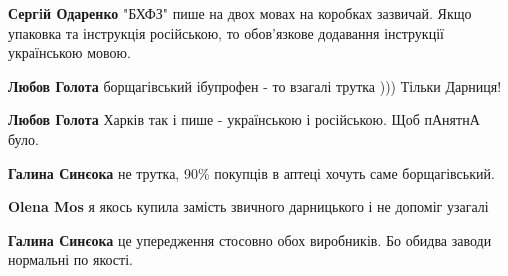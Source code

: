 \begin{itemize}
\begin{itemize}
\textbf{Сергiй Одаренко} "БХФЗ" пише на двох мовах на коробках зазвичай. Якщо
упаковка та інструкція російською, то обов'язкове додавання інструкції
українською мовою.

 
\textbf{Любов Голота} борщагівський ібупрофен - то взагалі трутка ))) Тільки Дарниця! \Smiley[1.0][yellow]

 
\textbf{Любов Голота}
Харків так і пише - українською і російською. Щоб пАнятнА було.

 
\textbf{Галина Синєока} не трутка, 90\% покупців в аптеці хочуть саме борщагівський.

 
\textbf{Olena Mos} я якось купила замість звичного дарницького і не допоміг узагалі 🙁

 
\textbf{Галина Синєока} це упередження стосовно обох виробників. Бо обидва заводи нормальні по якості.

 

\end{itemize}
\end{itemize}
